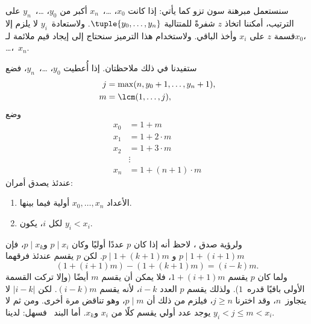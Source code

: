 \documentclass[../../../include/open-logic-section]{subfiles}
\begin{document}
سنستعمل مبرهنة سون تزو كما يأتي: إذا كانت $x_0$، \dots،~$x_n$ أكبر
من $y_0$، \dots،~$y_n$ على الترتيب، أمكننا اتخاذ $z$ شفرةً للمتتالية
$\tuple{y_0,\dots,y_n}$. ولاستعادة~$y_i$ لا يلزم إلا قسمة $z$ على
$x_i$ وأخذ الباقي. ولاستخدام هذا الترميز سنحتاج إلى إيجاد قيم ملائمة
لـ$x_0$، \dots،~$x_n$.

ستفيدنا في ذلك ملاحظتان. إذا أُعطيت $y_0$، \dots،~$y_n$، فضع
\begin{align*}
j &= \max(n, y_0 + 1, \dots, y_n + 1), \\
m &= \lcm(1,\dots,j),
\end{align*}
وضع
\begin{align*}
x_0 & = 1 + m \\
x_1 & = 1 + 2 \cdot m \\
x_2 & = 1 + 3 \cdot m \\
& \vdots  \\
x_n & = 1 + (n+1) \cdot m
\end{align*}
عندئذ يصدق أمران:
\begin{enumerate}
\item{} الأعداد $x_0,\dots,x_n$ أولية فيما بينها.
\item{} لكل $i$، يكون $y_i<x_i$.
\end{enumerate}
ولرؤية صدق ، لاحظ أنه إذا كان $p$ عددًا أوليًا وكان
$p\mid x_i$ و$p\mid x_k$، فإن $p\mid1+(i+1)m$ و
$p\mid1+(k+1)m$. لكن $p$ يقسم عندئذ فرقهما
\[
(1 + (i+1)m) - (1+ (k+1)m) = (i-k) m.
\]
ولما كان $p$ يقسم $1+(i+1)m$، فلا يمكن أن يقسم $m$ أيضًا (وإلا تركت
القسمة الأولى باقيًا قدره~$1$). ولذلك يقسم $p$ العدد $i-k$، لأنه يقسم
$(i-k)m$. لكن $\left|i-k\right|$ لا يتجاوز~$n$، وقد اخترنا
$j\geq n$، فيلزم من ذلك أن $p\mid m$، وهو تناقض مرة أخرى. ومن ثم لا
يوجد عدد أولي يقسم كلًا من $x_i$ و$x_k$. أما البند~ فسهل:
لدينا $y_i<j\leq m<x_i$.
\end{document}
